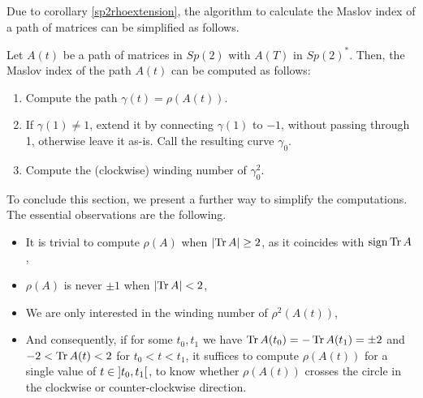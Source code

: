 Due to corollary \ref{sp2rhoextension}, the algorithm to calculate the Maslov index of a path of matrices can be simplified as follows.

\begin{prop}
Let $A(t)$ be a path of matrices in $Sp(2)$ with $A(T)$ in $Sp(2)^*$. Then, the Maslov index of the path $A(t)$ can be computed as follows:
\begin{algorithm}
\begin{enumerate}[algorithm]
\item Compute the path $\gamma(t) = \rho(A(t))$. 
\item If $\gamma(1) \neq 1$, extend it by connecting $\gamma(1)$ to $-1$, without passing through 1, otherwise leave it as-is. Call the resulting curve $\gamma_0$.
\item Compute the (clockwise) winding number of $\gamma_0^2$.
\end{enumerate}
\end{algorithm}
\end{prop}

To conclude this section, we present a further way to simplify the computations. The essential observations are the following.
\begin{itemize}
\item It is trivial to compute $\rho(A)$ when $\lvert\operatorname{Tr} A\rvert \geq 2$, as it coincides with $\operatorname{sign} \operatorname{Tr} A$,
\item $\rho(A)$ is never $\pm 1$ when $\lvert\operatorname{Tr} A\rvert < 2$,
\item We are only interested in the winding number of $\rho^2(A(t))$,
\item And consequently, if for some $t_0, t_1$ we have $\operatorname{Tr} A(t_0) = - \operatorname{Tr} A(t_1) = \pm 2$ and $-2 < \operatorname{Tr} A(t) < 2$ for $t_0 < t < t_1$, it suffices to compute $\rho(A(t))$ for a single value of $t \in \ointerval{t_0}{t_1}$, to know whether $\rho(A(t))$ crosses the circle in the clockwise or counter-clockwise direction.
\end{itemize}

